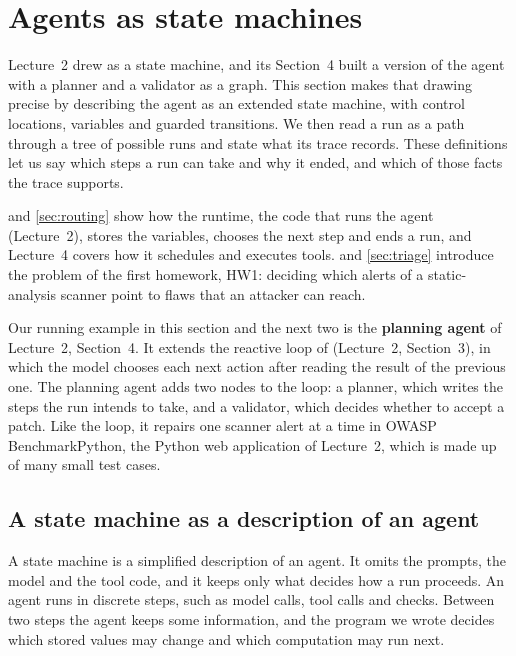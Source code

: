 \section{Agents as state machines}
\label{sec:machines}

Lecture~2 drew \msa{} as a state machine, and its Section~4 built a version of the agent with a
planner and a validator as a graph. This section makes that drawing precise by describing the agent
as an extended state machine, with control locations, variables and guarded transitions. We then
read a run as a path through a tree of possible runs and state what its trace records. These
definitions let us say which steps a run can take and why it ended, and which of those facts the
trace supports.

 and \cref{sec:routing} show how the runtime, the code that runs the agent
(Lecture~2), stores the variables, chooses the next step and ends a run, and Lecture~4 covers how it
schedules and executes tools.  and \cref{sec:triage} introduce the problem of the
first homework, HW1: deciding which alerts of a static-analysis scanner point to flaws that an
attacker can reach.

Our running example in this section and the next two is the \textbf{planning agent} of Lecture~2,
Section~4. It extends the reactive loop of \msa{} (Lecture~2, Section~3), in which the model chooses
each next action after reading the result of the previous one. The planning agent adds two nodes to
the loop: a planner, which writes the steps the run intends to take, and a validator, which decides
whether to accept a patch. Like the loop, it repairs one scanner alert at a time in OWASP
BenchmarkPython, the Python web application of Lecture~2, which is made up of many small test cases.

\subsection{A state machine as a description of an agent}
\label{sec:machines-description}

A state machine is a simplified description of an agent. It omits the prompts, the model and the
tool code, and it keeps only what decides how a run proceeds. An agent runs in discrete steps, such
as model calls, tool calls and checks. Between two steps the agent keeps some information, and the
program we wrote decides which stored values may change and which computation may run next.

